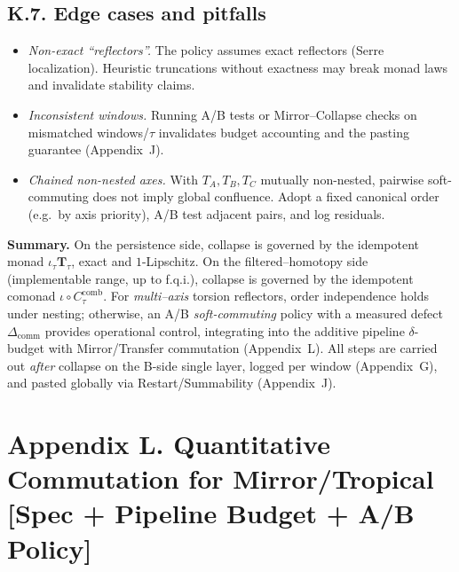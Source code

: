 \documentclass[11pt]{article}
\DeclareRobustCommand{\hyp}{\nobreakdash-}
\numberwithin{equation}{section}
\theoremstyle{definition}
\begin{document}
\subsection*{K.7. Edge cases and pitfalls}
\begin{itemize}\itemsep0.2em
  \item \emph{Non\hyp exact ``reflectors''.} The policy assumes exact reflectors (Serre localization). Heuristic truncations without exactness may break monad laws and invalidate stability claims.
  \item \emph{Inconsistent windows.} Running A/B tests or Mirror–Collapse checks on mismatched windows/\(\tau\) invalidates budget accounting and the pasting guarantee (Appendix~J).
  \item \emph{Chained non\hyp nested axes.} With \(T_A,T_B,T_C\) mutually non\hyp nested, pairwise soft\hyp commuting does not imply global confluence. Adopt a fixed canonical order (e.g.\ by axis priority), A/B test adjacent pairs, and log residuals.
\end{itemize}

\medskip
\noindent\textbf{Summary.}
On the persistence side, collapse is governed by the idempotent monad \(\iota_\tau\mathbf{T}_\tau\), exact and \(1\)\hyp Lipschitz.
On the filtered–homotopy side (implementable range, up to f.q.i.), collapse is governed by the idempotent comonad \(\iota\circ C_\tau^{\mathrm{comb}}\).
For \emph{multi–axis} torsion reflectors, order independence holds under nesting; otherwise, an A/B \emph{soft\hyp commuting} policy with a measured defect \(\Delta_{\mathrm{comm}}\) provides operational control, integrating into the additive pipeline \(\delta\)\hyp budget with Mirror/Transfer commutation (Appendix~L).
All steps are carried out \emph{after} collapse on the B\hyp side single layer, logged per window (Appendix~G), and pasted globally via Restart/Summability (Appendix~J).



\section*{Appendix L. Quantitative Commutation for Mirror/Tropical [Spec + Pipeline Budget + A/B Policy]}
{}
\label{L:quant-comm}
\end{document}
